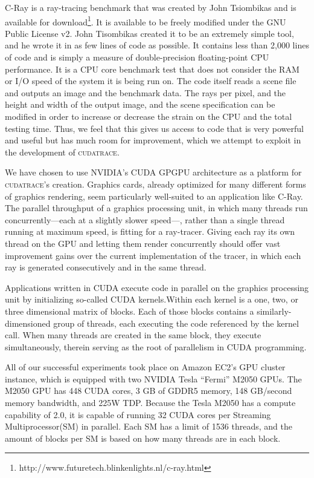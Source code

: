 \documentclass[12pt]{article}
\begin{document}
C-Ray is a ray-tracing benchmark that was created by John Tsiombikas and is available for download\footnote{http://www.futuretech.blinkenlights.nl/c-ray.html}. It is available to be freely modified under the GNU Public License v2. John Tisombikas created it to be an extremely simple tool, and he wrote it in as few lines of code as possible. It contains less than 2,000 lines of code and is simply a measure of double-precision floating-point CPU performance. It is a CPU core benchmark test that does not consider the RAM or I/O speed of the system it is being run on. The code itself reads a scene file and outputs an image and the benchmark data. The rays per pixel, and the height and width of the output image, and the scene specification can be modified in order to increase or decrease the strain on the CPU and the total testing time. Thus, we feel that this gives us access to code that is very powerful and useful but has much room for improvement, which we attempt to exploit in the development of \textsc{cudatrace}.

We have chosen to use NVIDIA's CUDA GPGPU architecture as a platform for \textsc{cudatrace}’s creation. Graphics cards, already optimized for many different forms of graphics rendering, seem particularly well-suited to an application like C-Ray. The parallel throughput of a graphics processing unit, in which many threads run concurrently---each at a slightly slower speed---, rather than a single thread running at maximum speed, is fitting for a ray-tracer. Giving each ray its own thread on the GPU and letting them render concurrently should offer vast improvement gains over the current implementation of the tracer, in which each ray is generated consecutively and in the same thread.

Applications written in CUDA execute code in parallel on the graphics processing unit by initializing so-called CUDA kernels.Within each kernel is a one, two, or three dimensional matrix of blocks. Each of those blocks contains a similarly-dimensioned group of threads, each executing the code referenced by the kernel call. When many threads are created in the same block, they execute simultaneously, therein serving as the root of parallelism in CUDA programming.

All of our successful experiments took place on Amazon EC2’s GPU cluster instance, which is equipped with two NVIDIA Tesla “Fermi” M2050 GPUs. The M2050 GPU has 448 CUDA cores, 3 GB of GDDR5 memory, 148 GB/second memory bandwidth, and 225W TDP. Because the Tesla M2050 has a compute capability of 2.0, it is capable of running 32  CUDA cores per Streaming Multiprocessor(SM) in parallel. Each SM has a limit of 1536 threads, and the amount of blocks per SM is based on how many threads are in each block.
\end{document}
